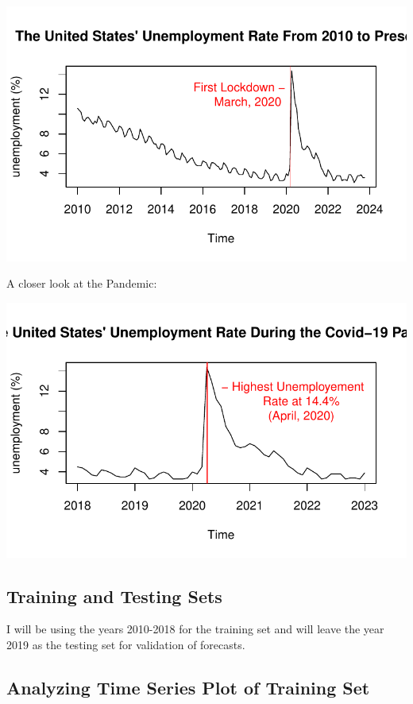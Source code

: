 \documentclass[
  letterpaper,
  DIV=11,
  numbers=noendperiod]{scrartcl}
\begin{document}
\includegraphics{Final_Project_files/figure-pdf/unnamed-chunk-1-1.pdf}

A closer look at the Pandemic:

\includegraphics{Final_Project_files/figure-pdf/unnamed-chunk-2-1.pdf}

\hypertarget{training-and-testing-sets}{%
\subsection{Training and Testing Sets}\label{training-and-testing-sets}}

I will be using the years 2010-2018 for the training set and will leave
the year 2019 as the testing set for validation of forecasts.

\hypertarget{analyzing-time-series-plot-of-training-set}{%
\subsection{Analyzing Time Series Plot of Training
Set}\label{analyzing-time-series-plot-of-training-set}}
\end{document}
